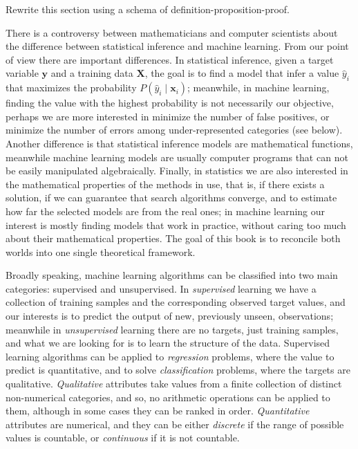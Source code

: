 {\color{red} Rewrite this section using a schema of definition-proposition-proof.}

There is a controversy between mathematicians and computer scientists about the difference between statistical inference and machine learning. From our point of view there are important differences. In statistical inference, given a target variable $\mathbf{y}$ and a training data $\mathbf{X}$, the goal is to find a model that infer a value $\hat{y}_i$ that maximizes the probability $P(\hat{y}_i \mid \mathbf{x}_i)$; meanwhile, in machine learning, finding the value with the highest probability is not necessarily our objective, perhaps we are more interested in minimize the number of false positives, or minimize the number of errors among under-represented categories (see below). Another difference is that statistical inference models are mathematical functions, meanwhile machine learning models are usually computer programs that can not be easily manipulated algebraically. Finally, in statistics we are also interested in the mathematical properties of the methods in use, that is, if there exists a solution, if we can guarantee that search algorithms converge, and to estimate how far the selected models are from the real ones; in machine learning our interest is mostly finding models that work in practice, without caring too much about their mathematical properties. The goal of this book is to reconcile both worlds into one single theoretical framework.

Broadly speaking, machine learning algorithms can be classified into two main categories: supervised and unsupervised. In \emph{supervised} learning we have a collection of training samples and the corresponding observed target values, and our interests is to predict the output of new, previously unseen, observations; meanwhile in \emph{unsupervised} learning there are no targets, just training samples, and what we are looking for is to learn the structure of the data. Supervised learning algorithms can be applied to \emph{regression} problems, where the value to predict is quantitative, and to solve \emph{classification} problems, where the targets are qualitative. \emph{Qualitative} attributes take values from a finite collection of distinct non-numerical categories, and so, no arithmetic operations can be applied to them, although in some cases they can be ranked in order. \emph{Quantitative} attributes are numerical, and they can be either \emph{discrete} if the range of possible values is countable, or \emph{continuous} if it is not countable.

